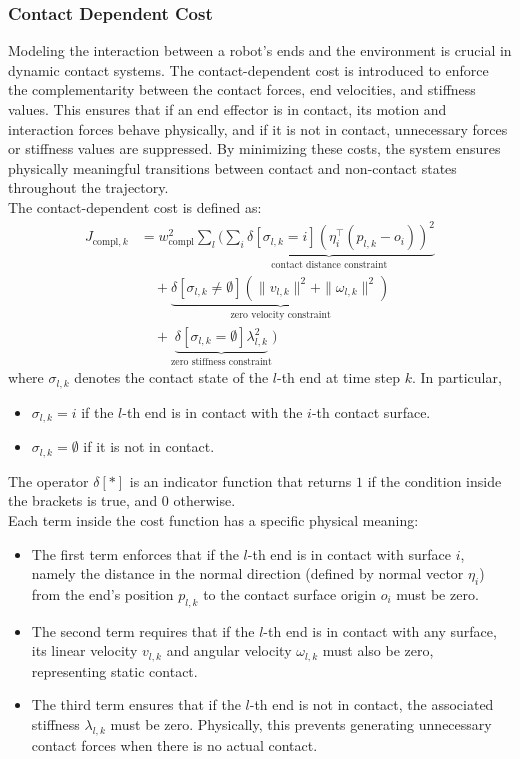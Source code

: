 \documentclass[main.tex]{subfiles}
\begin{document}
\subsubsection{Contact Dependent Cost}
Modeling the interaction between a robot's ends and the environment is crucial in dynamic contact systems. The contact-dependent cost is introduced to enforce the complementarity between the contact forces, end velocities, and stiffness values. This ensures that if an end effector is in contact, its motion and interaction forces behave physically, and if it is not in contact, unnecessary forces or stiffness values are suppressed.
By minimizing these costs, the system ensures physically meaningful transitions between contact and non-contact states throughout the trajectory.
\\
The contact-dependent cost is defined as:
\begin{equation}
\begin{aligned}
    J_{\text{compl},k} 
    &= w_{\text{compl}}^2 \sum_l \Bigg(
    \underbrace{ \sum_i \delta\left[\sigma_{l,k} = i\right] \left( \eta_i^\top (p_{l,k} - o_i) \right)^2 }_{\text{contact distance constraint}} \\
    &\quad + \underbrace{ \delta\left[\sigma_{l,k} \neq \emptyset\right] \left( \| v_{l,k} \|^2 + \| \omega_{l,k} \|^2 \right) }_{\text{zero velocity constraint}} \\
    &\quad + \underbrace{ \delta\left[\sigma_{l,k} = \emptyset\right] \lambda_{l,k}^2 }_{\text{zero stiffness constraint}}
    \Bigg)
\end{aligned}
\end{equation}
where $\sigma_{l,k}$ denotes the contact state of the $l$-th end at time step $k$. In particular, 
\begin{itemize}
    \item $\sigma_{l,k} = i$ if the $l$-th end is in contact with the $i$-th contact surface.
    \item $\sigma_{l,k} = \emptyset$ if it is not in contact.
\end{itemize}
The operator $\delta[\ast]$ is an indicator function that returns $1$ if the condition inside the brackets is true, and $0$ otherwise.
\\
Each term inside the cost function has a specific physical meaning:
\begin{itemize}
    \item The first term enforces that if the $l$-th end is in contact with surface $i$, namely the distance in the normal direction (defined by normal vector $\eta_i$) from the end's position $p_{l,k}$ to the contact surface origin $o_i$ must be zero.
    \item The second term requires that if the $l$-th end is in contact with any surface, its linear velocity $v_{l,k}$ and angular velocity $\omega_{l,k}$ must also be zero, representing static contact.
    \item The third term ensures that if the $l$-th end is not in contact, the associated stiffness $\lambda_{l,k}$ must be zero. Physically, this prevents generating unnecessary contact forces when there is no actual contact.
\end{itemize}
\end{document}

